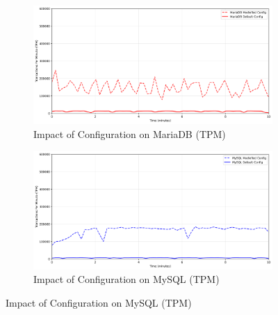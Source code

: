 \begin{figure}[H]
    \centering
    \hspace*{-1.7cm}
    \begin{subfigure}[b]{0.6\textwidth}
        \centering
        \includegraphics[width=\linewidth]{Images/dcnf_database_count_comparison_MariaDB.png}
        \caption{Impact of Configuration on MariaDB (TPM)}
        \label{fig:mariadb-dcnf}
    \end{subfigure}%
    \begin{subfigure}[b]{0.6\textwidth}
        \centering
        \includegraphics[width=\linewidth]{Images/dcnf_database_count_comparison_MySQL.png}
        \caption{Impact of Configuration on MySQL (TPM)}
        \label{fig:mysql-dcnf}
    \end{subfigure}

    \vspace{0.5cm}


\end{figure}
